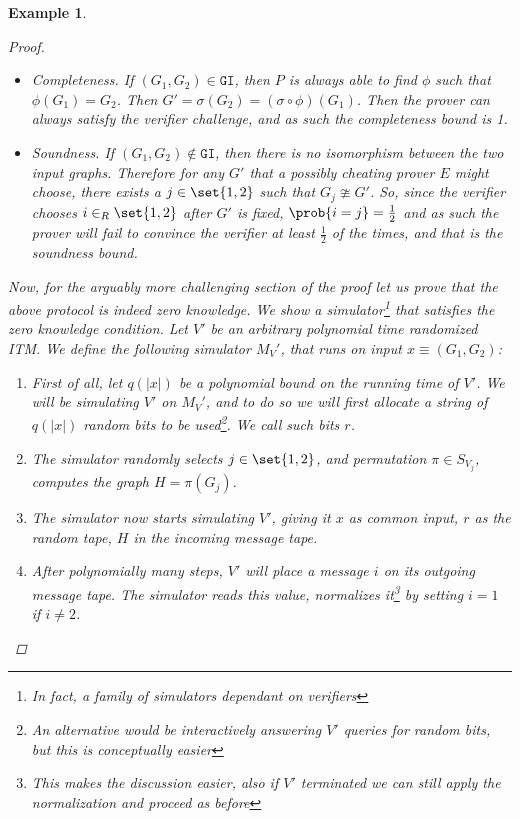 \documentclass{article}
\newtheorem{example}{Example}
\begin{document}
\begin{example}
\begin{proof}
        \begin{itemize}
            \item Completeness. If $(G_1, G_2) \in \texttt{GI}$, then $P$ is always able to find $\phi$ such that
                  $\phi(G_1) = G_2$. Then $G' = \sigma(G_2) = (\sigma \circ \phi) (G_1)$. Then the prover can always satisfy the verifier challenge,
                  and as such the completeness bound is 1.
            \item Soundness. If $(G_1, G_2) \notin \texttt{GI}$, then there is no isomorphism between the two input graphs. Therefore for any $G'$ that a
                  possibly cheating prover $E$ might choose, there exists a $j \in \set{1, 2}$ such that $G_j \ncong G'$. So, since the verifier chooses $i \in_R \set{1, 2}$ after $G'$ is fixed, $\prob{i = j} = \frac{1}{2}$ and as such the prover will fail to convince the verifier
                  at least $\frac{1}{2}$ of the times, and that is the soundness bound.
        \end{itemize}
        Now, for the arguably more challenging section of the proof let us prove that the above protocol is indeed zero knowledge.
        We show a simulator\footnote{In fact, a family of simulators dependant on verifiers} that satisfies the zero knowledge condition.
        Let $V'$ be an arbitrary polynomial time randomized ITM. We define the following simulator $M_V'$, that runs on input $x \equiv (G_1, G_2)$:
        \begin{enumerate}
            \item First of all, let $q(|x|)$ be a polynomial bound on the running time of $V'$. We will be simulating $V'$ on $M_V'$, and to do so we will first allocate a string of $q(|x|)$ random bits to be used\footnote{An alternative would be interactively answering $V'$ queries for random bits, but this is conceptually easier}. We call such bits $r$.
            \item The simulator randomly selects $j \in \set{1, 2 }$, and permutation $\pi \in S_{V_j}$, computes the graph $H = \pi(G_j)$.
            \item The simulator now starts simulating $V'$, giving it $x$ as common input, $r$ as the random tape, $H$ in the incoming message tape.
            \item After polynomially many steps, $V'$ will place a message $i$ on its outgoing message tape. The simulator reads this value, normalizes it\footnote{This makes the discussion easier, also if $V'$ terminated we can still apply the normalization and proceed as before} by setting $i = 1$ if $i \neq 2$.

\end{enumerate}
\end{proof}
\end{example}
\end{document}
